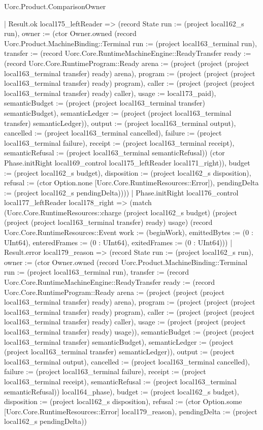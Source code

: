 \begin{lexlean}{Uorc.Product.ComparisonOwner}
\begin{semanticmodule}
{        | Result.ok local175_leftReader => (record State {run := (project local162_s run), owner := (ctor Owner.owned (record Uorc.Product.MachineBinding::Terminal {run := (project local163_terminal run), transfer := (record Uorc.Core.RuntimeMachineEngine::ReadyTransfer {ready := (record Uorc.Core.RuntimeProgram::Ready {arena := (project (project (project local163_terminal transfer) ready) arena), program := (project (project (project local163_terminal transfer) ready) program), caller := (project (project (project local163_terminal transfer) ready) caller), usage := local173_paid}), semanticBudget := (project (project local163_terminal transfer) semanticBudget), semanticLedger := (project (project local163_terminal transfer) semanticLedger)}), output := (project local163_terminal output), cancelled := (project local163_terminal cancelled), failure := (project local163_terminal failure), receipt := (project local163_terminal receipt), semanticRefusal := (project local163_terminal semanticRefusal)}) (ctor Phase.initRight local169_control local175_leftReader local171_right)), budget := (project local162_s budget), disposition := (project local162_s disposition), refusal := (ctor Option.none [Uorc.Core.RuntimeResources::Error]), pendingDelta := (project local162_s pendingDelta)})))
    | Phase.initRight local176_control local177_leftReader local178_right => (match (Uorc.Core.RuntimeResources::charge (project local162_s budget) (project (project (project local163_terminal transfer) ready) usage) (record Uorc.Core.RuntimeResources::Event {work := (beginWork), emittedBytes := (0 : UInt64), enteredFrames := (0 : UInt64), exitedFrames := (0 : UInt64)}))
      | Result.error local179_reason => (record State {run := (project local162_s run), owner := (ctor Owner.owned (record Uorc.Product.MachineBinding::Terminal {run := (project local163_terminal run), transfer := (record Uorc.Core.RuntimeMachineEngine::ReadyTransfer {ready := (record Uorc.Core.RuntimeProgram::Ready {arena := (project (project (project local163_terminal transfer) ready) arena), program := (project (project (project local163_terminal transfer) ready) program), caller := (project (project (project local163_terminal transfer) ready) caller), usage := (project (project (project local163_terminal transfer) ready) usage)}), semanticBudget := (project (project local163_terminal transfer) semanticBudget), semanticLedger := (project (project local163_terminal transfer) semanticLedger)}), output := (project local163_terminal output), cancelled := (project local163_terminal cancelled), failure := (project local163_terminal failure), receipt := (project local163_terminal receipt), semanticRefusal := (project local163_terminal semanticRefusal)}) local164_phase), budget := (project local162_s budget), disposition := (project local162_s disposition), refusal := (ctor Option.some [Uorc.Core.RuntimeResources::Error] local179_reason), pendingDelta := (project local162_s pendingDelta)})
}
\end{semanticmodule}
\end{lexlean}
